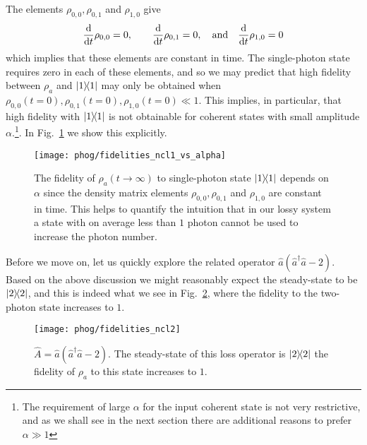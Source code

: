 The elements $\rho_{0, 0}, \rho_{0, 1}$ and $\rho_{1, 0}$ give
\begin{equation}
\ddt \rho_{0,0} = 0, \qq{} \ddt \rho_{0, 1} = 0, \qq{and} \ddt\rho_{1, 0} = 0 
\end{equation}
which implies that these elements are constant in time. The single-photon state requires zero in each of these elements, and so we may predict that high fidelity between $\rho_a$ and $\dyad{1}$ may only be obtained when $\rho_{0,0}\left(t=0\right), \rho_{0, 1}\left(t=0\right), \rho_{1, 0}\left(t=0\right) \ll 1$. This implies, in particular, that high fidelity with $\dyad{1}$ is not obtainable for coherent states with small amplitude $\alpha$.\footnote{The requirement of large $\alpha$ for the input coherent state is not very restrictive, and as we shall see in the next section there are additional reasons to prefer $\alpha \gg 1$}. In Fig.~\ref{fig:phog_fidelity_ncl_vs_alpha} we show this explicitly.

\begin{figure}[htp]
\centering
\texttt{[image: phog/fidelities\_ncl1\_vs\_alpha]}
\caption{\label{fig:phog_fidelity_ncl_vs_alpha} The fidelity of $\rho_a\left(t\rightarrow\infty\right)$ to single-photon state $\dyad{1}$ depends on $\alpha$ since the density matrix elements $\rho_{0, 0}, \rho_{0, 1}$ and $\rho_{1, 0}$ are constant in time. This helps to quantify the intuition that in our lossy system a state with on average less than $1$ photon cannot be used to increase the photon number.}
\end{figure}




Before we move on, let us quickly explore the related operator $\hat{a}\left(\hat{a}^\dagger \hat{a} -2\right)$. Based on the above discussion we might reasonably expect the steady-state to be $\dyad{2}$, and this is indeed what we see in Fig.~\ref{fig:phog_A_ncl2}, where the fidelity to the two-photon state increases to $1$.

\begin{figure}[htp]
\centering
\texttt{[image: phog/fidelities\_ncl2]}
\caption{\label{fig:phog_A_ncl2} $\hat{A} = \hat{a}\left(\hat{a}^\dagger \hat{a} - 2\right)$. The steady-state of this loss operator is $\dyad{2}$ the fidelity of $\rho_a$ to this state increases to $1$.}
\end{figure}



